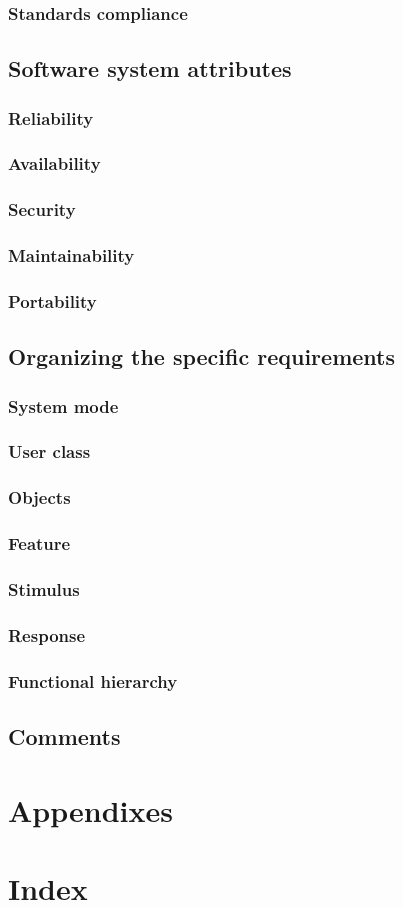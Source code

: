 \documentclass[draftclsnofoot,onecolumn,letterpaper,10pt,compsoc]{IEEEtran}
\begin{document}
		\subsubsection{Standards compliance}
	\subsection{Software system attributes}
		\subsubsection{Reliability}
		\subsubsection{Availability}
		\subsubsection{Security}
		\subsubsection{Maintainability}
		\subsubsection{Portability}
	\subsection{Organizing the specific requirements}
		\subsubsection{System mode}
		\subsubsection{User class}
		\subsubsection{Objects}
		\subsubsection{Feature}
		\subsubsection{Stimulus}
		\subsubsection{Response}
		\subsubsection{Functional hierarchy}
	\subsection{Comments}
\section{Appendixes}
\section{Index}

\pagebreak

\end{document}
